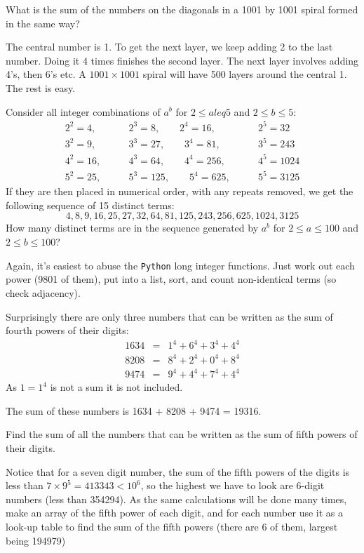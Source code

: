 What is the sum of the numbers on the diagonals in a 1001 by 1001 spiral formed in the same way?

The central number is 1.  To get the next layer, we keep adding 2 to the last number.  Doing it 4 times finishes the second layer.  The next layer involves adding 4's, then 6's etc.  A $1001\times1001$ spiral will have 500 layers around the central 1.
The rest is easy.




Consider all integer combinations of $a^b$ for $2 \leq a leq 5$ and $2 \leq b \leq 5$:
\begin{eqnarray*}
    2^2=4, \qquad &2^3=8, \qquad  2^4=16, \qquad &2^5=32      \\
    3^2=9, \qquad &3^3=27, \qquad 3^4=81, \qquad &3^5=243     \\
    4^2=16,\qquad &4^3=64, \qquad 4^4=256,\qquad &4^5=1024    \\
    5^2=25,\qquad &5^3=125,\qquad 5^4=625,\qquad &5^5=3125
\end{eqnarray*}
If they are then placed in numerical order, with any repeats removed, we get the following sequence of 15 distinct terms:
$$4, 8, 9, 16, 25, 27, 32, 64, 81, 125, 243, 256, 625, 1024, 3125$$
How many distinct terms are in the sequence generated by $a^b$ for $2 \leq a \leq 100$ and $2 \leq b \leq 100$?

Again, it's easiest to abuse the \verb"Python" long integer functions.  Just work out each power (9801 of them),
put into a list, sort, and count non-identical terms (so check adjacency).





Surprisingly there are only three numbers that can be written as the sum of fourth powers of their digits:
\begin{eqnarray*}
    1634 &= &1^4 + 6^4 + 3^4 + 4^4 \\
    8208 &= &8^4 + 2^4 + 0^4 + 8^4 \\
    9474 &= &9^4 + 4^4 + 7^4 + 4^4
\end{eqnarray*}
As $1 = 1^4$ is not a sum it is not included.

The sum of these numbers is 1634 + 8208 + 9474 = 19316.

Find the sum of all the numbers that can be written as the sum of fifth powers of their digits.

Notice that for a seven digit number, the sum of the fifth powers of the digits is less than
$7\times 9^5 = 413343 < 10^6$, so the highest we have to look are 6-digit numbers (less than 354294).
As the same calculations will be done many times, make an array of the fifth power of each digit,
and for each number use it as a look-up table to find the sum of the fifth powers (there are 6 of them,
largest being 194979)

